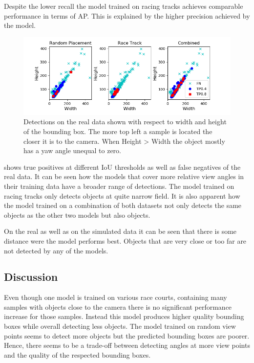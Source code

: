 Despite the lower recall the model trained on racing tracks achieves comparable performance in terms of AP. This is explained by the higher precision achieved by the model.

\begin{figure}[htbp]
	\centering
	\includegraphics[width=\textwidth]{fig/view_scatter}
	\caption{Detections on the real data shown with respect to width and height of the bounding box. The more top left a sample is located the closer it is to the camera. When Height > Width the object mostly has a yaw angle unequal to zero.}
	\label{fig:view_scatter}
\end{figure}

 shows true positives at different \ac{IoU} thresholds as well as false negatives of the real data. It can be seen how the models that cover more relative view angles in their training data have a broader range of detections. The model trained on racing tracks only detects objects at quite narrow field. It is also apparent how the model trained on a combination of both datasets not only detects the same objects as the other two models but also objects.

On the real as well as on the simulated data it can be seen that there is some distance were the model performs best. Objects that are very close or too far are not detected by any of the models.

\subsection{Discussion}

Even though one model is trained on various race courts, containing many samples with objects close to the camera there is no significant performance increase for those samples. Instead this model produces higher quality bounding boxes while overall detecting less objects. The model trained on random view points seems to detect more objects but the predicted bounding boxes are poorer. Hence, there seems to be a trade-off between detecting angles at more view points and the quality of the respected bounding boxes. 

